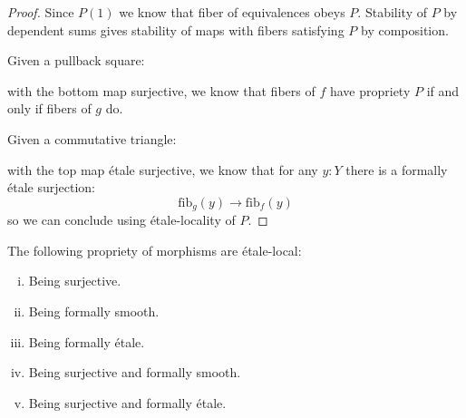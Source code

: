\begin{proof}
Since $P(1)$ we know that fiber of equivalences obeys $P$. Stability of $P$ by dependent sums gives stability of maps with fibers satisfying $P$ by composition.

Given a pullback square:
  \begin{center}
  \end{center}
  with the bottom map surjective, we know that fibers of $f$ have propriety $P$ if and only if fibers of $g$ do.
  
  Given a commutative triangle:
    \begin{center}
  \end{center}
  with the top map étale surjective, we know that for any $y:Y$ there is a formally étale surjection:
  \[\mathrm{fib}_g(y) \to \mathrm{fib}_f(y)\]
  so we can conclude using étale-locality of $P$.
\end{proof}

\begin{lemma}\label{etale-local-class-maps}
The following propriety of morphisms are étale-local:
\begin{enumerate}[(i)]
\item Being surjective.
\item Being formally smooth.
\item Being formally étale.
\item Being surjective and formally smooth.
\item Being surjective and formally étale.
\end{enumerate}
\end{lemma}

